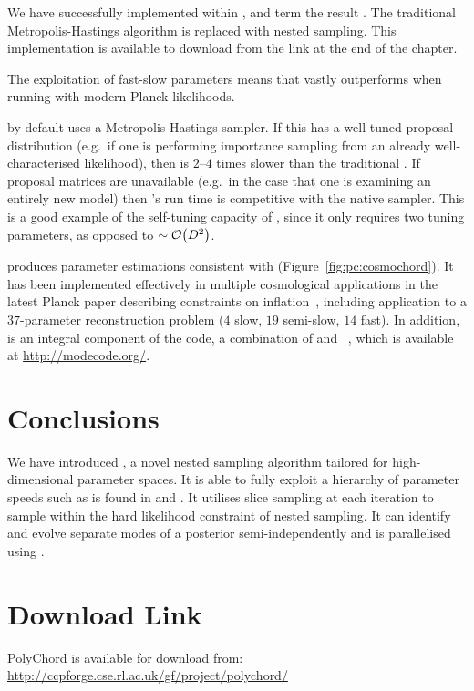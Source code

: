 We have successfully implemented \PolyChord{} within \CosmoMC{}, and term the result \CosmoChord{}.  The traditional Metropolis-Hastings algorithm is replaced with nested sampling. This implementation is available to download from the link at the end of the chapter.

The exploitation of fast-slow parameters means that \CosmoChord{} vastly outperforms \MultiNest{} when running with modern Planck likelihoods. 

\CosmoMC{} by default uses a Metropolis-Hastings sampler. If this has a well-tuned proposal distribution (e.g.\ if one is performing importance sampling from an already well-characterised likelihood), then \PolyChord{} is \(2\)--\(4\) times slower than the traditional \CosmoMC{}. If proposal matrices are unavailable (e.g.\ in the case that one is examining an entirely new model) then \CosmoChord{}'s run time is competitive with the native \CosmoMC{} sampler. This is a good example of the self-tuning capacity of \PolyChord{}, since it only requires two tuning parameters, as opposed to \({\sim\mathcal{O}{\left(D^2\right)}}\).

\CosmoChord{} produces parameter estimations consistent with \CosmoMC{} (Figure~\ref{fig:pc:cosmochord}).
It has been implemented effectively in multiple cosmological applications in the latest Planck paper describing constraints on inflation~\citep{planck2015-a24}, including application to a \(37\)-parameter reconstruction problem (\(4\) slow, \(19\) semi-slow, \(14\) fast). 
In addition, \PolyChord{} is an integral component of the \ModeChord{} code, a combination of \CosmoChord{} and \ModeCode{}~\citep{ModeChord1,ModeChord2,ModeChord3}, which is available at \url{http://modecode.org/}.

\section{Conclusions}
\label{sec:pc:conclusions}
We have introduced \PolyChord{}, a novel nested sampling algorithm tailored for high-dimensional parameter spaces. It is able to fully exploit a hierarchy of parameter speeds such as is found in \CosmoMC{} and \CAMB{}. It utilises slice sampling at each iteration to sample within the hard likelihood constraint of nested sampling. It can identify and evolve separate modes of a posterior semi-independently and is parallelised using \openMPI{}.












\section*{Download Link}
PolyChord is available for download from:\\ \url{http://ccpforge.cse.rl.ac.uk/gf/project/polychord/}


